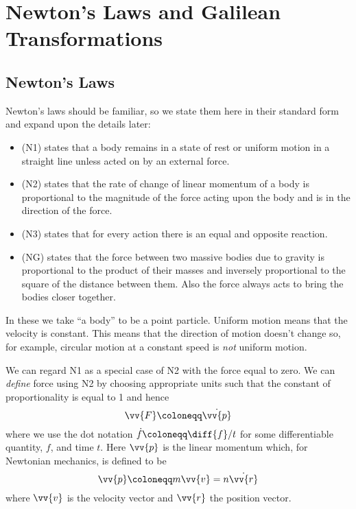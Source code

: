 \chapter{Newton's Laws and Galilean Transformations}
    \section{Newton's Laws}
    Newton's laws should be familiar, so we state them here in their standard form and expand upon the details later:
    \begin{itemize}
    \item {} (N1) states that a body remains in a state of rest or uniform motion in a straight line unless acted on by an external force.
    
    \item {} (N2) states that the rate of change of linear momentum of a body is proportional to the magnitude of the force acting upon the body and is in the direction of the force.
    
    \item {} (N3) states that for every action there is an equal and opposite reaction.
    
    \item {} (NG) states that the force between two massive bodies due to gravity is proportional to the product of their masses and inversely proportional to the square of the distance between them.
    Also the force always acts to bring the bodies closer together.
    \end{itemize}
    
    In these we take \enquote{a body} to be a point particle.
    Uniform motion means that the velocity is constant.
    This means that the direction of motion doesn't change so, for example, circular motion at a constant speed is \emph{not} uniform motion.
    
    We can regard N1 as a special case of N2 with the force equal to zero.
    We can \emph{define} force using N2 by choosing appropriate units such that the constant of proportionality is equal to 1 and hence
    \begin{equation}
        \vv{F} \coloneqq \dot{\vv{p}}
    \end{equation}
    where we use the dot notation \(\dot{f} \coloneqq \diff{f}/{t}\) for some differentiable quantity, \(f\), and time \(t\).
    Here \(\vv{p}\) is the linear momentum which, for Newtonian mechanics, is defined to be
    \begin{equation}
        \vv{p} \coloneqq m\vv{v} = n\dot{\vv{r}}
    \end{equation}
    where \(\vv{v}\) is the velocity vector and \(\vv{r}\) the position vector.
    
